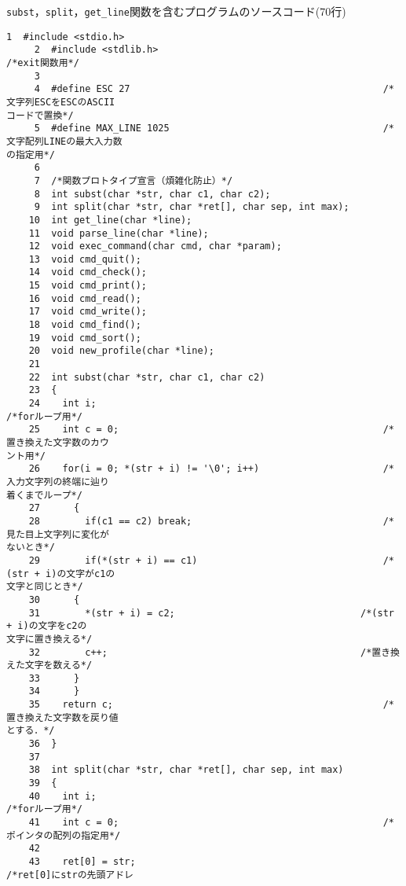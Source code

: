 \verb|subst|，\verb|split|，\verb|get_line|関数を含むプログラムのソースコード(70行)\label{func}
\begin{Verbatim}[fontsize=\small, baselinestretch=0.8]
     1	#include <stdio.h>
     2	#include <stdlib.h>                                        /*exit関数用*/
     3	
     4	#define ESC 27                                             /*文字列ESCをESCのASCII
コードで置換*/
     5	#define MAX_LINE 1025                                      /*文字配列LINEの最大入力数
の指定用*/
     6	
     7	/*関数プロトタイプ宣言（煩雑化防止）*/
     8	int subst(char *str, char c1, char c2);
     9	int split(char *str, char *ret[], char sep, int max);
    10	int get_line(char *line);
    11	void parse_line(char *line);
    12	void exec_command(char cmd, char *param);
    13	void cmd_quit();
    14	void cmd_check();
    15	void cmd_print();
    16	void cmd_read();
    17	void cmd_write();
    18	void cmd_find();
    19	void cmd_sort();
    20	void new_profile(char *line);
    21	
    22	int subst(char *str, char c1, char c2)
    23	{
    24	  int i;                                                   /*forループ用*/
    25	  int c = 0;                                               /*置き換えた文字数のカウ
ント用*/
    26	  for(i = 0; *(str + i) != '\0'; i++)                      /*入力文字列の終端に辿り
着くまでループ*/
    27	    {
    28	      if(c1 == c2) break;                                  /*見た目上文字列に変化が
ないとき*/
    29	      if(*(str + i) == c1)                                 /*(str + i)の文字がc1の
文字と同じとき*/
    30		{
    31		  *(str + i) = c2;                                 /*(str + i)の文字をc2の
文字に置き換える*/
    32		  c++;                                             /*置き換えた文字を数える*/
    33		}
    34	    }
    35	  return c;                                                /*置き換えた文字数を戻り値
とする．*/
    36	}
    37	
    38	int split(char *str, char *ret[], char sep, int max)
    39	{
    40	  int i;                                                   /*forループ用*/
    41	  int c = 0;                                               /*ポインタの配列の指定用*/
    42	
    43	  ret[0] = str;                                            /*ret[0]にstrの先頭アドレ

\end{Verbatim}
